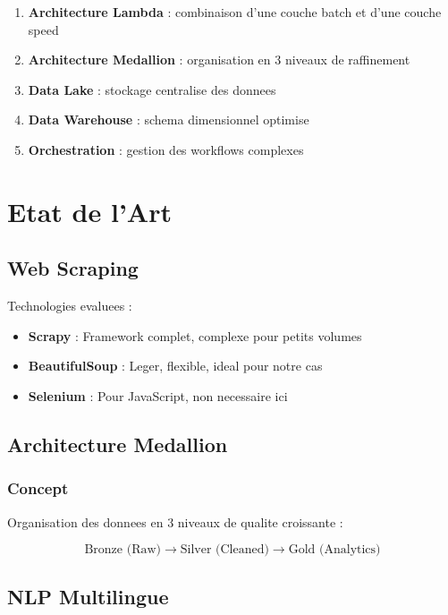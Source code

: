 \documentclass[12pt,a4paper]{report}
\begin{document}
\begin{enumerate}
    \item \textbf{Architecture Lambda} : combinaison d'une couche batch et d'une couche speed
    \item \textbf{Architecture Medallion} : organisation en 3 niveaux de raffinement
    \item \textbf{Data Lake} : stockage centralise des donnees
    \item \textbf{Data Warehouse} : schema dimensionnel optimise
    \item \textbf{Orchestration} : gestion des workflows complexes
\end{enumerate}


\chapter{Etat de l'Art}

\section{Web Scraping}

Technologies evaluees :

\begin{itemize}
    \item \textbf{Scrapy} : Framework complet, complexe pour petits volumes
    \item \textbf{BeautifulSoup} : Leger, flexible, ideal pour notre cas
    \item \textbf{Selenium} : Pour JavaScript, non necessaire ici
\end{itemize}

\section{Architecture Medallion}

\subsection{Concept}

Organisation des donnees en 3 niveaux de qualite croissante :

\[
\text{Bronze (Raw)} \rightarrow \text{Silver (Cleaned)} \rightarrow \text{Gold (Analytics)}
\]

\section{NLP Multilingue}
\end{document}
